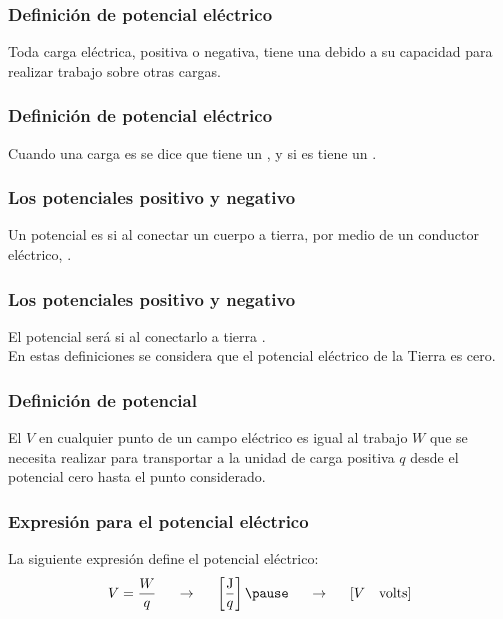 \documentclass[14pt]{beamer}
\begin{document}
\begin{frame}
\frametitle{Definición de potencial eléctrico}
Toda carga eléctrica, positiva o negativa, tiene una  debido a su capacidad para realizar trabajo sobre otras cargas. 
\end{frame}
\begin{frame}
\frametitle{Definición de potencial eléctrico}
Cuando una carga es  se dice que tiene un , \pause y si es  tiene un .
\end{frame}
\begin{frame}
\frametitle{Los potenciales positivo y negativo}
Un potencial es  si al conectar un cuerpo a tierra, por medio de un conductor eléctrico, .
\end{frame}
\begin{frame}
\frametitle{Los potenciales positivo y negativo}
El potencial será  si al conectarlo a tierra .
\\
\bigskip
\pause
En estas definiciones se considera que el potencial eléctrico de la Tierra es cero.
\end{frame}
\begin{frame}
\frametitle{Definición de potencial}
El  $V$ en cualquier punto de un campo eléctrico es igual al trabajo $W$ que se necesita realizar para transportar a la unidad de carga positiva $q$ desde el potencial cero hasta el punto considerado.
\end{frame}
\begin{frame}
\frametitle{Expresión para el potencial eléctrico}
La siguiente expresión define el potencial eléctrico:
\pause
\begin{eqnarray*}
\begin{aligned}
V = \dfrac{W}{q} \hspace{0.5cm} \rightarrow \hspace{0.5cm} \left[ \dfrac{\unit{\joule}}{q} \right] \pause \hspace{0.5cm} \rightarrow \hspace{0.5cm} \left[ V \quad \text{volts} \right]
\end{aligned}
\end{eqnarray*}
\end{frame}
\end{document}
